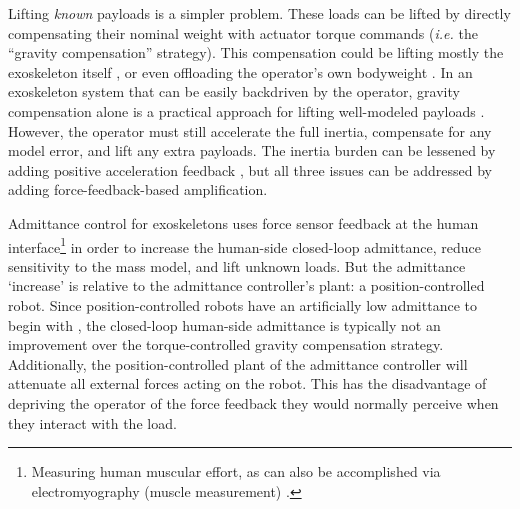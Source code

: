 \documentclass[utf8]{frontiersSCNS}
\renewcommand*{\cite}[1]{\citep{#1}}
\begin{document}
Lifting \emph{known} payloads is a simpler problem. These loads can be lifted by directly compensating their nominal weight with actuator torque commands (\emph{i.e.} the ``gravity compensation'' strategy).
This compensation could be lifting mostly the exoskeleton itself \cite{KazerooniRacineHuangSteger2005ICRA}, or even offloading the operator's own bodyweight \cite{KongMoonJeonTomizuka2010TMech,LvZhuGregg2018CSM,LinLvGregg2019ACC}.
In an exoskeleton system that can be easily backdriven by the operator, gravity compensation alone is a practical approach for lifting well-modeled payloads \cite{Campbell2018Thesis}.
However, the operator must still accelerate the full inertia, compensate for any model error, and lift any extra payloads.
The inertia burden can be lessened by adding positive acceleration feedback \cite{Kazerooni2005IROS,KongTomizuka2009TMech}, but all three issues can be addressed by adding force-feedback-based amplification.


Admittance control for exoskeletons \cite{YuRosen2013TCyb,FontanaVertechyMarcheschiSalsedoBergamasco2014RAM,JacobsenOlivier2014Patent,LecoursStongeGosselin2012ICRA} uses force sensor feedback at the human interface\footnote{Measuring human muscular effort, as can also be accomplished via electromyography (muscle measurement) \cite{KawamotoSankai2005AR,YoungFerris2016TNSRE}.} in order to increase the human-side closed-loop admittance, reduce sensitivity to the mass model, and lift unknown loads. But the admittance `increase' is relative to the admittance controller's plant: a position-controlled robot. Since position-controlled robots have an artificially low admittance to begin with \cite{YuRosen2013TCyb,GonzalezAsada2019RAL}, the closed-loop human-side admittance is typically not an improvement over the torque-controlled gravity compensation strategy. Additionally, the position-controlled plant of the admittance controller will attenuate all external forces acting on the robot. This has the disadvantage of depriving the operator of the force feedback they would normally perceive when they interact with the load.
\end{document}
